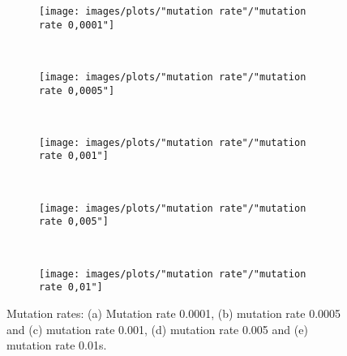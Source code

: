 \documentclass[12pt]{report}
\begin{document}
\begin{figure}[h!]
    \centering
      \begin{subfigure}[b]{0.31\textwidth}
        \texttt{[image: images/plots/"mutation rate"/"mutation rate 0,0001"]}
        \caption{}
        \hfill
        \label{plot:single point crossover}
    \end{subfigure}
    ~
      \begin{subfigure}[b]{0.31\textwidth}
        \texttt{[image: images/plots/"mutation rate"/"mutation rate 0,0005"]}
        \caption{}
        \hfill
        \label{plot:single point crossover}
    \end{subfigure}
    ~
    \begin{subfigure}[b]{0.31\textwidth}
        \texttt{[image: images/plots/"mutation rate"/"mutation rate 0,001"]}
        \caption{}
        \hfill
        \label{plot:single point crossover}
    \end{subfigure}
    ~
    \begin{subfigure}[b]{0.31\textwidth}
        \texttt{[image: images/plots/"mutation rate"/"mutation rate 0,005"]}
        \caption{}
        \hfill
        \label{plot:two point crossover}
    \end{subfigure}
    ~
    \begin{subfigure}[b]{0.31\textwidth}
        \texttt{[image: images/plots/"mutation rate"/"mutation rate 0,01"]}
        \caption{}
        \hfill
        \label{plot:uniform crossover}
    \end{subfigure}
    \caption{Mutation rates: (a) Mutation rate 0.0001, (b) mutation rate 0.0005 and (c) mutation rate 0.001, (d) mutation rate 0.005 and (e) mutation rate 0.01s.}
    \label{plot:crossover methods}
\end{figure}
\end{document}
